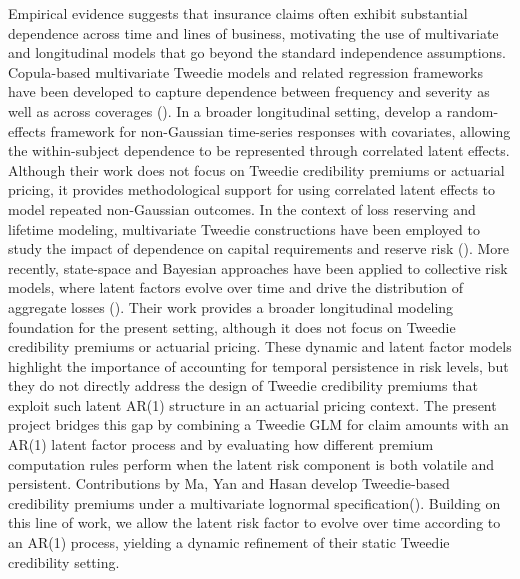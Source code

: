 \documentclass{sfuthesis}
\numberwithin{equation}{chapter}
\begin{document}
Empirical evidence suggests that insurance claims often exhibit substantial dependence across time and lines of business, motivating the use of multivariate and longitudinal models that go beyond the standard independence assumptions. Copula-based multivariate Tweedie models and related regression frameworks have been developed to capture dependence between frequency and severity as well as across coverages (\cite{peng2016multilevel,shi2016insurance,frees2016multivariate,lee2019dependent,shi2022copula}). In a broader longitudinal setting, \cite{yan2013} develop a random-effects framework for non-Gaussian time-series responses with covariates, allowing the within-subject dependence to be represented through correlated latent effects. Although their work does not focus on
Tweedie credibility premiums or actuarial pricing, it provides methodological support for
using correlated latent effects to model repeated non-Gaussian outcomes. In the context of loss reserving and lifetime modeling, multivariate Tweedie constructions have been employed to study the impact of dependence on capital requirements and reserve risk (\cite{furman2010multivariate,avanzi2016stochastic,alai2016multivariate}). More recently, state-space and Bayesian approaches have been applied to collective risk models, where latent factors evolve over time and drive the distribution of aggregate losses (\cite{youn2023simple,jeong2020predictive}). Their work provides a broader longitudinal modeling foundation for the present setting, although it does not focus on Tweedie credibility premiums or actuarial pricing. These dynamic and latent factor models highlight the importance of accounting for temporal persistence in risk levels, but they do not directly address the design of Tweedie credibility premiums that exploit such latent AR(1) structure in an actuarial pricing context. The present project bridges this gap by combining a Tweedie GLM for claim amounts with an AR(1) latent factor process and by evaluating how different premium computation rules perform when the latent risk component is both volatile and persistent. Contributions by Ma, Yan and Hasan develop Tweedie-based credibility premiums under a multivariate lognormal specification(\cite{ma2018tweedie}). Building on this line of work, we allow the latent risk factor to evolve over time according to an AR(1) process, yielding a dynamic refinement of their static Tweedie credibility setting.
\end{document}
